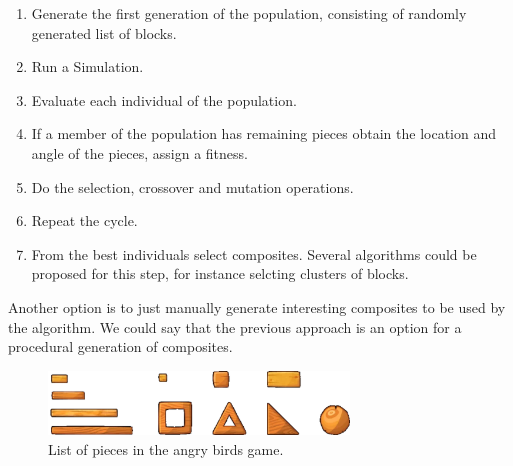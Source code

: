 \documentclass[conference]{IEEEtran}
\begin{document}
    
    
    \begin{enumerate}
    \item Generate the first generation of the population, consisting of
    randomly generated list of blocks.
    \item Run a Simulation.
    \item Evaluate each individual of the population.
    \item If a member of the population has remaining pieces obtain the location
    and angle of the pieces, assign a fitness.
    \item Do the selection, crossover and mutation operations.
    \item Repeat the cycle.
    \item From the best individuals select composites. Several algorithms could
    be proposed for this step, for instance selcting clusters of blocks.
    \end{enumerate}
    
    Another option is to just manually generate interesting composites to be used by the algorithm.
    We could say that the previous approach is an option for a procedural generation of composites.

    \begin{figure}[htbp]
    \centerline{\includegraphics[width=80mm]{Images/list_pieces.png}}
    \caption{List of pieces in the angry birds game.}
    \label{piece_list}
    \end{figure}
    
    
\end{document}
